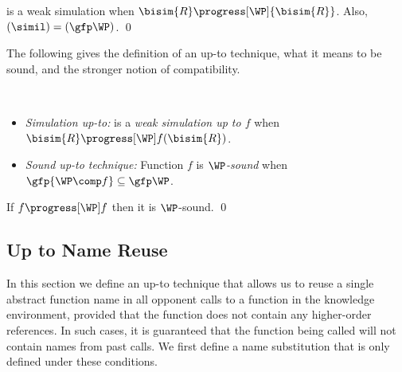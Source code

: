 \begin{lemma}
   is a weak simulation when ${\bisim{R}}\progress[\WP]{\bisim{R}}$.
  Also, $({\simil}) = (\gfp\WP)$.
  \qed
\end{lemma}
The following gives the definition of an up-to technique, what it means to be sound, and the stronger notion of compatibility.
\begin{definition}~
  \begin{itemize}
    \item\emph{Simulation up-to:}
       is a \emph{weak simulation up to $f$} when ${\bisim{R}} \progress[\WP] f(\bisim{R})$.

    \item\emph{Sound up-to technique:}
      Function $f$ is \emph{$\WP$-sound} when $\gfp{\WP\comp f} \subseteq \gfp\WP$.

  \end{itemize}
\end{definition}

\begin{lemma} \label{lem:compat-sound} %
  If $f\progress[\WP]f$ then it is $\WP$-sound.
  \qed
\end{lemma}


\subsection{Up to Name Reuse}
\label{sec:up-to-nr}

In this section we define an up-to technique that allows us to reuse a single abstract function name in all opponent calls to a function in the knowledge environment, provided that the function does not contain any higher-order references.
In such cases, it is guaranteed that the function being called will not contain names from past calls.
We first define a name substitution that is only defined under these conditions.

